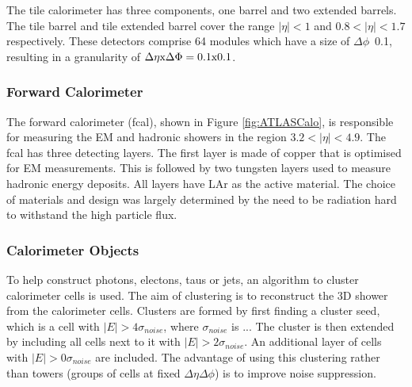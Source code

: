 The tile calorimeter has three components, one barrel and two extended barrels. 
The tile barrel and tile extended barrel cover the range $|\eta|<1$ and $0.8<|\eta|<1.7$ respectively. 
These detectors comprise 64 modules which have a size of $\Delta\phi$~0.1, resulting in a granularity of $\Delta\eta \rm{x} \Delta\Phi = 0.1\rm{x}0.1$.

\subsubsection{Forward Calorimeter}

The forward calorimeter (fcal), shown in Figure \ref{fig:ATLASCalo}, is responsible for measuring the EM and hadronic showers in the region $3.2<|\eta|<4.9$.
The fcal has three detecting layers. 
The first layer is made of copper that is optimised for EM measurements.
This is followed by two tungsten layers used to measure hadronic energy deposits. 
All layers have LAr as the active material. 
The choice of materials and design was largely determined by the need to be radiation hard to withstand the  high particle flux.


\subsubsection{Calorimeter Objects}

To help construct photons, electons, taus or jets, an algorithm to cluster calorimeter cells is used. 
The aim of clustering is to reconstruct the 3D shower from the calorimeter cells. 
Clusters are formed by first finding a cluster seed, which is a cell with $|E|>4\sigma_{noise}$, where $\sigma_{noise}$ is ... 
The cluster is then extended by including all cells next to it with $|E|>2\sigma_{noise}$. 
An additional layer of cells with $|E|>0\sigma_{noise}$ are included. 
The advantage of using this clustering rather than towers (groups of cells at fixed $\Delta\eta\Delta\phi$) is to improve noise suppression.



